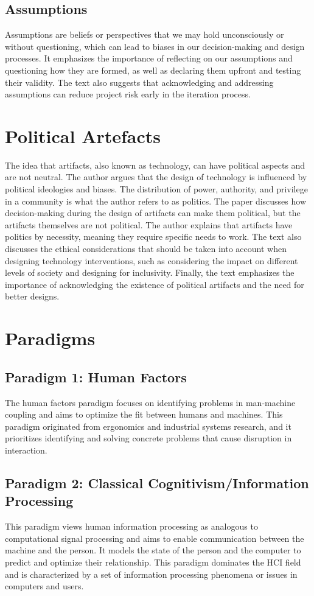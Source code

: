 \documentclass{article}
\begin{document}
\subsection{Assumptions}
Assumptions are beliefs or perspectives that we may hold unconsciously or without questioning, which can lead to biases in our decision-making and design processes. It emphasizes the importance of reflecting on our assumptions and questioning how they are formed, as well as declaring them upfront and testing their validity. The text also suggests that acknowledging and addressing assumptions can reduce project risk early in the iteration process.

\section{Political Artefacts}
The idea that artifacts, also known as technology, can have political aspects and are not neutral. The author argues that the design of technology is influenced by political ideologies and biases. The distribution of power, authority, and privilege in a community is what the author refers to as politics. The paper discusses how decision-making during the design of artifacts can make them political, but the artifacts themselves are not political. The author explains that artifacts have politics by necessity, meaning they require specific needs to work. The text also discusses the ethical considerations that should be taken into account when designing technology interventions, such as considering the impact on different levels of society and designing for inclusivity. Finally, the text emphasizes the importance of acknowledging the existence of political artifacts and the need for better designs.


\section{Paradigms}

\subsection{Paradigm 1: Human Factors}
The human factors paradigm focuses on identifying problems in man-machine coupling and aims to optimize the fit between humans and machines. This paradigm originated from ergonomics and industrial systems research, and it prioritizes identifying and solving concrete problems that cause disruption in interaction.

\subsection{Paradigm 2: Classical Cognitivism/Information Processing }
This paradigm views human information processing as analogous to computational signal processing and aims to enable communication between the machine and the person. It models the state of the person and the computer to predict and optimize their relationship. This paradigm dominates the HCI field and is characterized by a set of information processing phenomena or issues in computers and users.
\end{document}
